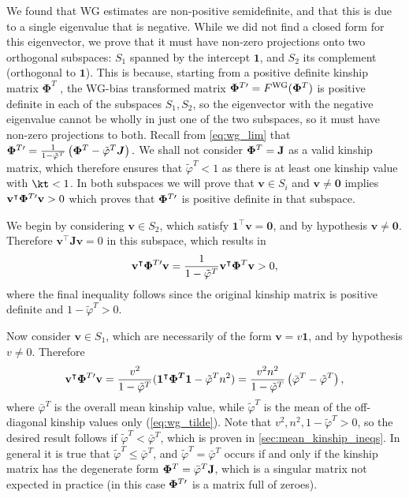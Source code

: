 \documentclass[11pt]{article}
\newcommand{\kinMat}[1][T]{%
  \ensuremath{%
    \mathbf{\Phi}^{#1}
  }%
  \xspace%
}%
\newcommand{\kinMatPrime}{%
  \ensuremath{%
    \mathbf{\Phi}^{T\prime}
  }%
  \xspace%
}%
\begin{document}
\begin{appendices}
  \label{sec:wg_posdef}

  We found that WG estimates are non-positive semidefinite, and that this is due to a single eigenvalue that is negative.
  While we did not find a closed form for this eigenvector, we prove that it must have non-zero projections onto two orthogonal subspaces: $S_1$ spanned by the intercept $\mathbf{1}$, and $S_2$ its complement (orthogonal to $\mathbf{1}$).
  This is because, starting from a positive definite kinship matrix \kinMat, the WG-bias transformed matrix $\kinMatPrime = F^\text{WG}( \kinMat )$ is positive definite in each of the subspaces $S_1, S_2$, so the eigenvector with the negative eigenvalue cannot be wholly in just one of the two subspaces, so it must have non-zero projections to both.
  Recall from \cref{eq:wg_lim} that
  $
  \kinMatPrime
  =
  \frac{1}{1-\tilde{\varphi}^T} \left( \kinMat - \tilde{\varphi}^T \boldsymbol{J} \right)
  .
  $
  We shall not consider $\kinMat = \mathbf{J}$ as a valid kinship matrix, which therefore ensures that $\tilde{\varphi}^T < 1$ as there is at least one kinship value with $\kt < 1$.
  In both subspaces we will prove that $\mathbf{v} \in S_i$ and $\mathbf{v} \ne \mathbf{0}$ implies $\mathbf{v}^\intercal \kinMatPrime \mathbf{v} > 0$ which proves that $\kinMatPrime$ is positive definite in that subspace.
  
  We begin by considering $\mathbf{v} \in S_2$, which satisfy $\mathbf{1}^\intercal \mathbf{v} = \mathbf{0}$, and by hypothesis $\mathbf{v} \ne \mathbf{0}$.
  Therefore $\mathbf{v}^\intercal \mathbf{J} \mathbf{v} = 0$ in this subspace, which results in
  $$
  \mathbf{v}^\intercal \kinMatPrime \mathbf{v}
  =
  \frac{1}{1-\tilde{\varphi}^T} \mathbf{v}^\intercal \kinMat \mathbf{v}
  >
  0
  ,
  $$
  where the final inequality follows since the original kinship matrix is positive definite and $1-\tilde{\varphi}^T > 0$.

  Now consider $\mathbf{v} \in S_1$, which are necessarily of the form $\mathbf{v} = v \mathbf{1}$, and by hypothesis $v \ne 0$.
  Therefore
  $$
  \mathbf{v}^\intercal \kinMatPrime \mathbf{v}
  =
  \frac{ v^2 }{1-\tilde{\varphi}^T}(\boldsymbol{1^\intercal \kinMat 1} - \tilde{\varphi}^T n^2)
  =
  \frac{ v^2 n^2 }{1-\tilde{\varphi}^T} \left( \bar{\varphi}^T - \tilde{\varphi}^T \right)
  ,
  $$
  where $\bar{\varphi}^T$ is the overall mean kinship value, while $\tilde{\varphi}^T$ is the mean of the off-diagonal kinship values only (\cref{eq:wg_tilde}).
  Note that $v^2, n^2, 1 - \tilde{\varphi}^T > 0$, so the desired result follows if $\tilde{\varphi}^T < \bar{\varphi}^T$, which is proven in \cref{sec:mean_kinship_ineqs}.
  In general it is true that $\tilde{\varphi}^T \le \bar{\varphi}^T$, and $\tilde{\varphi}^T = \bar{\varphi}^T$ occurs if and only if the kinship matrix has the degenerate form $\kinMat = \bar{\varphi}^T \mathbf{J}$, which is a singular matrix not expected in practice (in this case $\kinMatPrime$ is a matrix full of zeroes).


\end{appendices}
\end{document}
